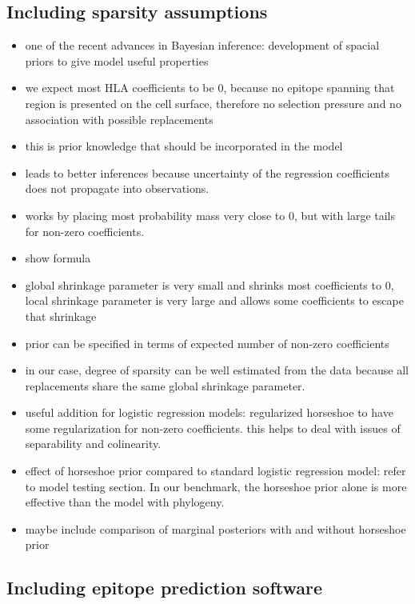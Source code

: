 \documentclass[fleqn,11pt]{SelfArx} %
\begin{document}
\subsection*{Including sparsity assumptions}

\begin{itemize}
  \item one of the recent advances in Bayesian inference: development of spacial priors to give model useful properties
  \item we expect most HLA coefficients to be 0, because no epitope spanning that region is presented on the cell surface, therefore no selection pressure and no association with possible replacements
  \item this is prior knowledge that should be incorporated in the model
  \item leads to better inferences because uncertainty of the regression coefficients does not propagate into observations.
  \item works by placing most probability mass very close to 0, but with large tails for non-zero coefficients.
  \item show formula
  \item global shrinkage parameter is very small and shrinks most coefficients to 0, local shrinkage parameter is very large and allows some coefficients to escape that shrinkage
  \item prior can be specified in terms of expected number of non-zero coefficients
  \item in our case, degree of sparsity can be well estimated from the data because all replacements share the same global shrinkage parameter.
  \item useful addition for logistic regression models: regularized horseshoe to have some regularization for non-zero coefficients. this helps to deal with issues of separability and colinearity.
  \item effect of horseshoe prior compared to standard logistic regression model: refer to model testing section. In our benchmark, the horseshoe prior alone is more effective than the model with phylogeny.
  \item maybe include comparison of marginal posteriors with and without horseshoe prior
\end{itemize}

\subsection*{Including epitope prediction software}
\end{document}
